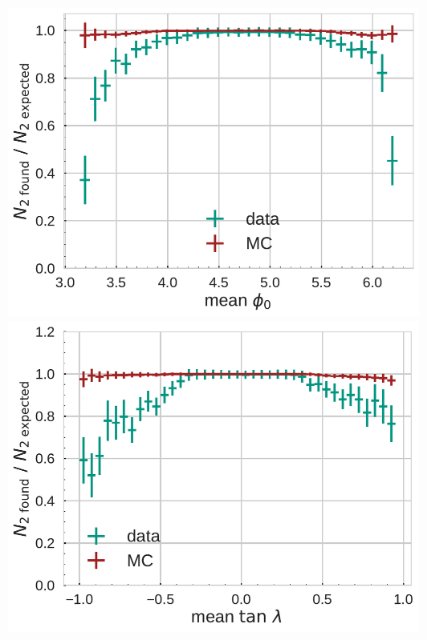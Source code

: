 \documentclass[18pt]{beamer}
\begin{document}
\begin{frame}
\begin{columns}
\begin{column}{0.5\textwidth}
    \end{column}
    \begin{column}{0.5\textwidth}
      \centering
      \includegraphics[width=0.85\textwidth]{figures/efficiency_study/cosmicbased_findeff_over_phi0.pdf}\\
      \includegraphics[width=0.85\textwidth]{figures/efficiency_study/cosmicbased_findeff_over_tan_lambda.pdf}
    \end{column}
  \end{columns}
\end{frame}
\end{document}

